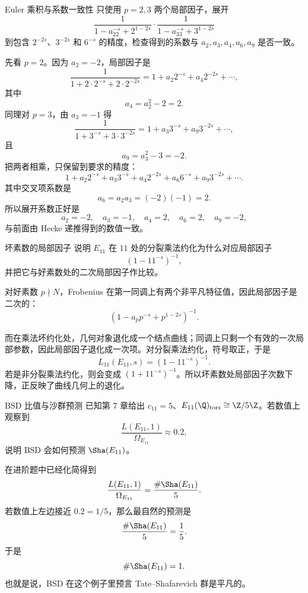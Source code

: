 \begin{problem}{Euler 乘积与系数一致性}
\hard
只使用 $p=2,3$ 两个局部因子，展开
\[
\frac{1}{1-a_22^{-s}+2^{1-2s}}\cdot \frac{1}{1-a_33^{-s}+3^{1-2s}}
\]
到包含 $2^{-2s}$、$3^{-2s}$ 和 $6^{-s}$ 的精度，检查得到的系数与 $a_2,a_3,a_4,a_6,a_9$ 是否一致。
\end{problem}
\begin{solution}
先看 $p=2$。因为 $a_2=-2$，局部因子是
\[
\frac{1}{1+2\cdot 2^{-s}+2\cdot 2^{-2s}}=1+a_2 2^{-s}+a_4 2^{-2s}+\cdots,
\]
其中
\[
a_4=a_2^2-2=2.
\]
同理对 $p=3$，由 $a_3=-1$ 得
\[
\frac{1}{1+3^{-s}+3\cdot 3^{-2s}}=1+a_3 3^{-s}+a_9 3^{-2s}+\cdots,
\]
且
\[
a_9=a_3^2-3=-2.
\]
把两者相乘，只保留到要求的精度：
\[
1+a_2 2^{-s}+a_3 3^{-s}+a_4 2^{-2s}+a_6 6^{-s}+a_9 3^{-2s}+\cdots.
\]
其中交叉项系数是
\[
a_6=a_2a_3=(-2)(-1)=2.
\]
所以展开系数正好是
\[
a_2=-2,\quad a_3=-1,\quad a_4=2,\quad a_6=2,\quad a_9=-2,
\]
与前面由 Hecke 递推得到的数值一致。
\end{solution}

\begin{problem}{坏素数的局部因子}
\hard
说明 $E_{11}$ 在 $11$ 处的分裂乘法约化为什么对应局部因子
\[
(1-11^{-s})^{-1},
\]
并把它与好素数处的二次局部因子作比较。
\end{problem}
\begin{solution}
对好素数 $p\nmid N$，Frobenius 在第一同调上有两个非平凡特征值，因此局部因子是二次的：
\[
(1-a_pp^{-s}+p^{1-2s})^{-1}.
\]

而在乘法坏约化处，几何对象退化成一个结点曲线；同调上只剩一个有效的一次局部参数，因此局部因子退化成一次项。对分裂乘法约化，符号取正，于是
\[
L_{11}(E_{11},s)=(1-11^{-s})^{-1}.
\]
若是非分裂乘法约化，则会变成 $(1+11^{-s})^{-1}$。所以坏素数处局部因子次数下降，正反映了曲线几何上的退化。
\end{solution}

\begin{problem}{BSD 比值与沙群预测}
\hard
已知第 7 章给出 $c_{11}=5$、$E_{11}(\Q)_{\mathrm{tors}}\cong \Z/5\Z$。若数值上观察到
\[
\frac{L(E_{11},1)}{\Omega_{E_{11}}}\approx 0.2,
\]
说明 BSD 会如何预测 $\Sha(E_{11})$。
\end{problem}
\begin{solution}
在进阶题中已经化简得到
\[
\frac{L(E_{11},1)}{\Omega_{E_{11}}}=\frac{\#\Sha(E_{11})}{5}.
\]
若数值上左边接近 $0.2=1/5$，那么最自然的预测是
\[
\frac{\#\Sha(E_{11})}{5}=\frac15.
\]
于是
\[
\#\Sha(E_{11})=1.
\]
也就是说，BSD 在这个例子里预言 Tate--Shafarevich 群是平凡的。
\end{solution}

